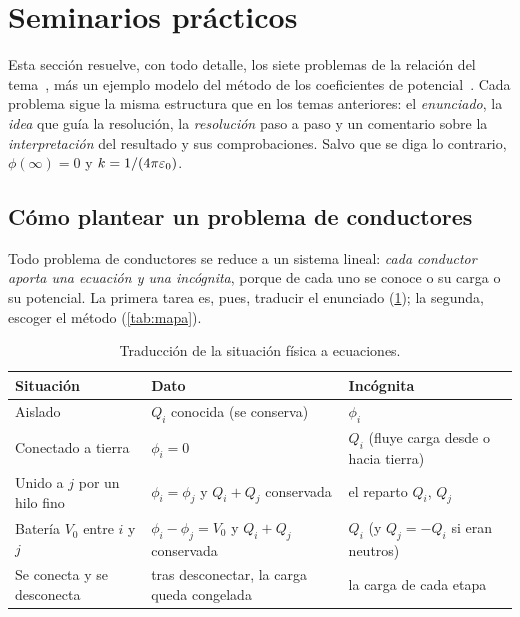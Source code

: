 \section{Seminarios prácticos}\label{sec:seminarios}
Esta sección resuelve, con todo detalle, los siete problemas de la relación del tema~\cite{PROBLEMAS-T3}, más un ejemplo modelo del método de los
coeficientes de potencial~\cite{GUIA-T3}. Cada problema sigue la misma estructura que en los temas anteriores: el \emph{enunciado}, la \emph{idea} que guía
la resolución, la \emph{resolución} paso a paso y un comentario sobre la \emph{interpretación} del resultado y sus comprobaciones. Salvo que se diga lo
contrario, $\phi(\infty)=0$ y $k=1/(4\pi\varepsilon_{0})$.

\subsection{Cómo plantear un problema de conductores}\label{sem:metodo}
Todo problema de conductores se reduce a un sistema lineal: \emph{cada conductor aporta una ecuación y una incógnita}, porque de cada uno se conoce o su
carga o su potencial. La primera tarea es, pues, traducir el enunciado (\cref{tab:traduccion}); la segunda, escoger el método (\cref{tab:mapa}).

\begin{table}[ht]
\centering
\caption{Traducción de la situación física a ecuaciones.}
\label{tab:traduccion}
\small
\begin{tabularx}{\linewidth}{@{}>{\raggedright\arraybackslash}p{4.1cm}>{\raggedright\arraybackslash}X>{\raggedright\arraybackslash}p{4.3cm}@{}}
  \toprule
  Situación & Dato & Incógnita\\
  \midrule
  Aislado & $Q_i$ conocida (se conserva) & $\phi_i$\\
  Conectado a tierra & $\phi_i=0$ & $Q_i$ (fluye carga desde o hacia tierra)\\
  Unido a $j$ por un hilo fino & $\phi_i=\phi_j$ y $Q_i+Q_j$ conservada & el reparto $Q_i$, $Q_j$\\
  Batería $V_0$ entre $i$ y $j$ & $\phi_i-\phi_j=V_0$ y $Q_i+Q_j$ conservada & $Q_i$ (y $Q_j=-Q_i$ si eran neutros)\\
  Se conecta y se desconecta & tras desconectar, la carga queda congelada & la carga de cada etapa\\
  \bottomrule
\end{tabularx}
\end{table}

